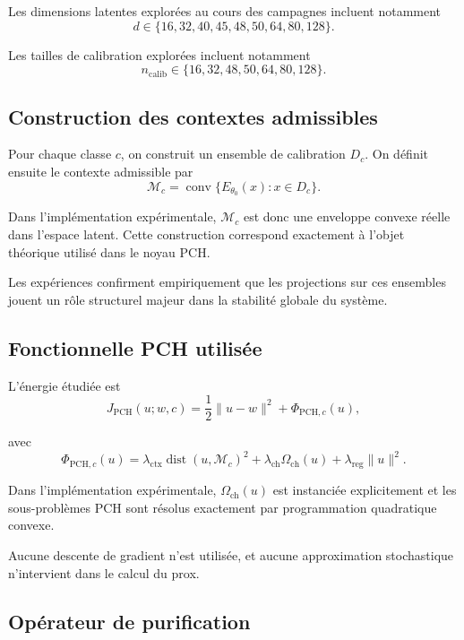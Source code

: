 \documentclass[11pt,a4paper]{article}
\newcommand{\1}{\mathbf 1}
\begin{document}
Les dimensions latentes explorées au cours des campagnes incluent notamment
\[
d \in \{16,32,40,45,48,50,64,80,128\}.
\]

Les tailles de calibration explorées incluent notamment
\[
n_{\mathrm{calib}} \in \{16,32,48,50,64,80,128\}.
\]

\subsection{Construction des contextes admissibles}

Pour chaque classe \(c\), on construit un ensemble de calibration \(D_c\). On définit ensuite le contexte admissible par
\[
\mathcal M_c = \operatorname{conv}\{E_{\theta_0}(x) : x \in D_c\}.
\]

Dans l’implémentation expérimentale, \(\mathcal M_c\) est donc une enveloppe convexe réelle dans l’espace latent. Cette construction correspond exactement à l’objet théorique utilisé dans le noyau PCH.

Les expériences confirment empiriquement que les projections sur ces ensembles jouent un rôle structurel majeur dans la stabilité globale du système.

\subsection{Fonctionnelle PCH utilisée}

L’énergie étudiée est
\[
J_{\mathrm{PCH}}(u;w,c)
=
\frac12\|u-w\|^2 + \Phi_{\mathrm{PCH},c}(u),
\]

avec
\[
\Phi_{\mathrm{PCH},c}(u)
=
\lambda_{\mathrm{ctx}}\operatorname{dist}(u,\mathcal M_c)^2
+
\lambda_{\mathrm{ch}}\Omega_{\mathrm{ch}}(u)
+
\lambda_{\mathrm{reg}}\|u\|^2.
\]

Dans l’implémentation expérimentale, \(\Omega_{\mathrm{ch}}(u)\) est instanciée explicitement et les sous-problèmes PCH sont résolus exactement par programmation quadratique convexe.

Aucune descente de gradient n’est utilisée, et aucune approximation stochastique n’intervient dans le calcul du prox.

\subsection{Opérateur de purification}
\end{document}
